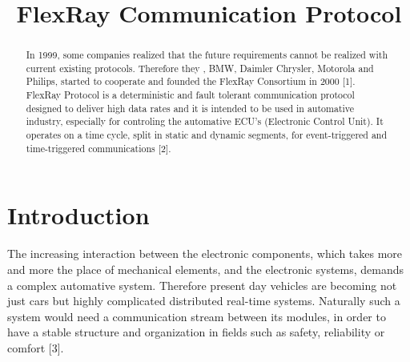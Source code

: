 \documentclass[conference]{IEEEtran}
\begin{document}
\title{FlexRay Communication Protocol\\
}

\author{
\and
{}

}

\maketitle

\begin{abstract}
In 1999, some companies realized that the future requirements cannot be realized with current existing protocols. Therefore they , BMW, Daimler Chrysler, Motorola and Philips, started to cooperate and founded the FlexRay Consortium in 2000 [1]. FlexRay Protocol is a deterministic and fault tolerant communication protocol designed to deliver high data rates and it is intended to be used in automative industry, especially for controling the automative ECU's (Electronic Control Unit). It operates on a time cycle, split in static and dynamic segments, for event-triggered and time-triggered communications [2].
\end{abstract}

\begin{IEEEkeywords}

\end{IEEEkeywords}

\section{Introduction}
The increasing interaction between the electronic components, which takes more and more the place of mechanical elements, and the electronic systems, demands a complex automative system. Therefore present day vehicles are becoming not just cars but highly complicated distributed real-time systems. Naturally such a system would need a communication stream between its modules, in order to have a stable structure and organization in fields such as safety, reliability or comfort [3].
\end{document}
